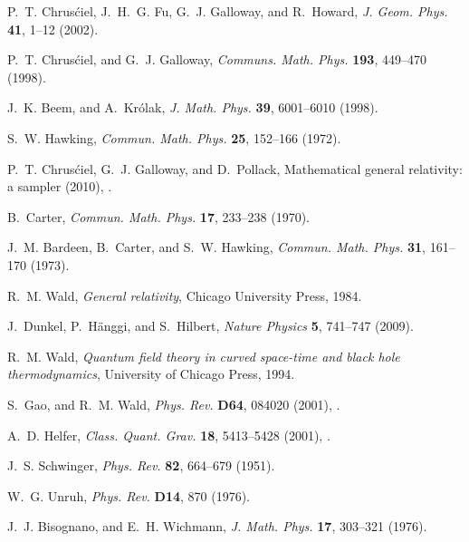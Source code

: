 \documentclass[12pt]{article}
\begin{document}
\begin{thebibliography}{57}
P.~T. Chrus\'ciel, J.~H.~G. Fu, G.~J. Galloway, and R.~Howard, \emph{J. Geom.
  Phys.} \textbf{41}, 1--12 (2002).

P.~T. Chrus\'ciel, and G.~J. Galloway, \emph{Communs. Math. Phys.}
  \textbf{193}, 449--470 (1998).

J.~K. Beem, and A.~Kr\'olak, \emph{J. Math. Phys.} \textbf{39}, 6001--6010
  (1998).

S.~W. Hawking, \emph{Commun. Math. Phys.} \textbf{25}, 152--166 (1972).

P.~T. Chrus\'ciel, G.~J. Galloway, and D.~Pollack, {Mathematical general
  relativity: a sampler} (2010), .

B.~Carter, \emph{Commun. Math. Phys.} \textbf{17}, 233--238 (1970).

J.~M. Bardeen, B.~Carter, and S.~W. Hawking, \emph{Commun. Math. Phys.}
  \textbf{31}, 161--170 (1973).

R.~M. Wald, \emph{General relativity}, Chicago University Press, 1984.

J.~Dunkel, P.~H\"anggi, and S.~Hilbert, \emph{Nature Physics} \textbf{5},
  741--747 (2009).

R.~M. Wald, \emph{Quantum field theory in curved space-time and black hole
  thermodynamics}, University of Chicago Press, 1994.

S.~Gao, and R.~M. Wald, \emph{Phys. Rev.} \textbf{D64}, 084020 (2001),
  .

A.~D. Helfer, \emph{Class. Quant. Grav.} \textbf{18}, 5413--5428 (2001),
  .

J.~S. Schwinger, \emph{Phys. Rev.} \textbf{82}, 664--679 (1951).

W.~G. Unruh, \emph{Phys. Rev.} \textbf{D14}, 870 (1976).

J.~J. Bisognano, and E.~H. Wichmann, \emph{J. Math. Phys.} \textbf{17},
  303--321 (1976).


\end{thebibliography}
\end{document}
